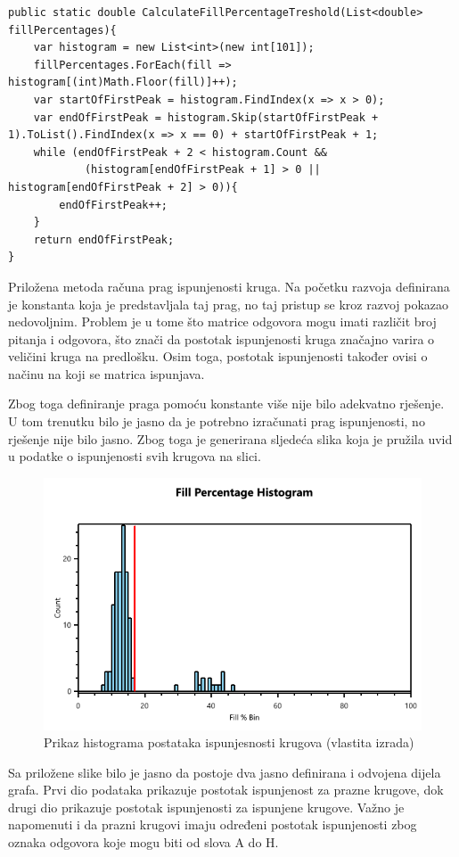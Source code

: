 \documentclass{foi}
\begin{document}
\begin{lstlisting}[caption={Metoda za filtriranje neispravnih krugova i pitanja}]
public static double CalculateFillPercentageTreshold(List<double> fillPercentages){
    var histogram = new List<int>(new int[101]);
    fillPercentages.ForEach(fill => histogram[(int)Math.Floor(fill)]++);
    var startOfFirstPeak = histogram.FindIndex(x => x > 0);
    var endOfFirstPeak = histogram.Skip(startOfFirstPeak + 1).ToList().FindIndex(x => x == 0) + startOfFirstPeak + 1;
    while (endOfFirstPeak + 2 < histogram.Count &&
            (histogram[endOfFirstPeak + 1] > 0 || histogram[endOfFirstPeak + 2] > 0)){
        endOfFirstPeak++;
    }
    return endOfFirstPeak;
}
\end{lstlisting}

Priložena metoda računa prag ispunjenosti kruga. Na početku razvoja definirana je konstanta koja je predstavljala taj prag, no taj pristup se kroz razvoj pokazao nedovoljnim. Problem je u tome što matrice odgovora mogu imati različit broj pitanja i odgovora, što znači da postotak ispunjenosti kruga značajno varira o veličini kruga na predlošku. Osim toga, postotak ispunjenosti također ovisi o načinu na koji se matrica ispunjava.

Zbog toga definiranje praga pomoću konstante više nije bilo adekvatno rješenje. U tom trenutku bilo je jasno da je potrebno izračunati prag ispunjenosti, no rješenje nije bilo jasno. Zbog toga je generirana sljedeća slika koja je pružila uvid u podatke o ispunjenosti svih krugova na slici.

\begin{figure}[H]
\centering
\includegraphics[width=0.7\linewidth]{slike/histogram.png}
\caption{Prikaz histograma postataka ispunjesnosti krugova (vlastita izrada)}
\end{figure}
\pagebreak
Sa priložene slike bilo je jasno da postoje dva jasno definirana i odvojena dijela grafa. Prvi dio podataka prikazuje postotak ispunjenost za prazne krugove, dok drugi dio prikazuje postotak ispunjenosti za ispunjene krugove. Važno je napomenuti i da prazni krugovi imaju određeni postotak ispunjenosti zbog oznaka odgovora koje mogu biti od slova A do H.
\end{document}
